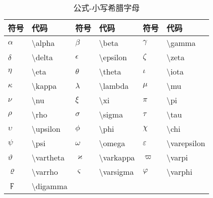 \documentclass[UTF8,fontset=ubuntu]{ctexart}
\begin{document}
\begin{table}[H]
\begin{minipage}{\textwidth}
\begin{tabular}{l l l l l l}
	\hline
	符号 & 代码 & 符号 & 代码 & 符号 & 代码\\
	\hline
	$\alpha$ & \textbackslash alpha & $\beta$ & \textbackslash beta & $\gamma$ & \textbackslash gamma\\
	$\delta$ & \textbackslash delta & $\epsilon$ & \textbackslash epsilon & $\zeta$ & \textbackslash zeta\\
	$\eta$ & \textbackslash eta & $\theta$ & \textbackslash theta & $\iota$ & \textbackslash iota\\
	$\kappa$ & \textbackslash kappa & $\lambda$ & \textbackslash lambda & $\mu$ & \textbackslash mu\\
	$\nu$ & \textbackslash nu & $\xi$ & \textbackslash xi & $\pi$ & \textbackslash pi\\
	$\rho$ & \textbackslash rho & $\sigma$ & \textbackslash sigma & $\tau$ & \textbackslash tau\\
	$\upsilon$ & \textbackslash upsilon & $\phi$ & \textbackslash phi & $\chi$ & \textbackslash chi\\
	$\psi$ & \textbackslash psi & $\omega$ & \textbackslash omega & $\varepsilon$ & \textbackslash varepsilon\\
	$\vartheta$ & \textbackslash vartheta & $\varkappa$ & \textbackslash varkappa\footnotemark[1] & $\varpi$ & \textbackslash varpi\\
	$\varrho$ & \textbackslash varrho\footnotemark[1] & $\varsigma$ & \textbackslash varsigma & $\varphi$ & \textbackslash varphi\\
	$\digamma$ & \textbackslash digamma\footnotemark[1]\\
	\hline
\end{tabular}
\end{minipage}
\caption{公式-小写希腊字母}
\end{table}
\end{document}
